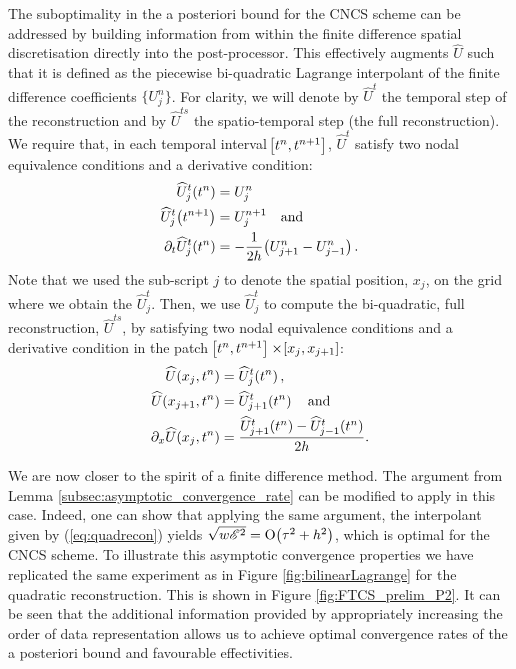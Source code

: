 \documentclass[final]{amsart}
\numberwithin{equation}{section}
\begin{document}
The suboptimality in the a posteriori bound for the CNCS scheme can be
addressed by building information from within the
finite difference spatial discretisation directly into the
post-processor.  This effectively augments $\widehat U$ such that it is
defined as the piecewise bi-quadratic Lagrange interpolant of the finite
difference coefficients $\{U^n_j\}$.  For clarity, we will denote by $\widehat{ U}^t$ the temporal step of the reconstruction and by $\widehat{ U}^{ts}$ the spatio-temporal step (the full reconstruction).   We require that, in each temporal interval $\!\left[{t^n, t^{n+1}}\right]$, $\widehat{ U}^t$ satisfy two nodal equivalence conditions and a derivative condition:
\begin{equation}
  \label{eq:quadrecon}
\begin{split}
\widehat{U}_j^t\!\left({t^n}\right) &= U_j^n
\\
\widehat{U}_j^t\!\left({t^{n+1}}\right) &= U_j^{n+1}\quad \text{and}
\\
\partial_t\widehat{U}_j^t\!\left({t^n}\right) &= -\frac{1}{2h}\!\left({U_{j+1}^{n}-U_{j-1}^{n}}\right).
\end{split}
\end{equation}
Note that we used the sub-script $j$ to denote the spatial position, $x_j$, on the grid where we obtain the $\widehat{U}^t_j$.  Then, we use  $\widehat{U}^t_j$ to compute the bi-quadratic, full reconstruction,  $\widehat{ U}^{ts}$, by satisfying two nodal equivalence conditions and a derivative condition  in the patch $\!\left[{t^n,t^{n+1}}\right]\times\!\left[{x_j,x_{j+1}}\right]$:
\begin{equation}
 \begin{split}
\widehat U(x_j,t^n) &= \widehat{U}_j^t\!\left({t^n}\right) ,
\\
\widehat U(x_{j+1},t^n) &= \widehat{U}_{j+1}^t\!\left({t^n}\right) \quad \text{and}
\\
\partial_x \widehat U(x_j, t^n) &= \frac{\widehat{U}_{j+1}^t\!\left({t^n}\right) -\widehat{U}_{j-1}^t\!\left({t^n}\right) }{2h}.
\end{split}
\end{equation}


We are now closer to the spirit of a finite difference method. The
argument from Lemma \ref{subsec:asymptotic_convergence_rate} can be
modified to apply in this case. Indeed, one can show that applying the
same argument, the interpolant given by (\ref{eq:quadrecon}) yields
$\sqrt{w\mathscr E^2} = \operatorname{O}\!\left({\tau^2+h^2}\right)$, which is optimal for the CNCS
scheme. To illustrate this asymptotic convergence properties we have
replicated the same experiment as in Figure \ref{fig:bilinearLagrange}
for the quadratic reconstruction. This is shown in Figure
\ref{fig:FTCS_prelim_P2}.  It can be seen that the additional
information provided by appropriately increasing the order of data
representation allows us to achieve optimal convergence rates of the a
posteriori bound and favourable effectivities.
\end{document}
